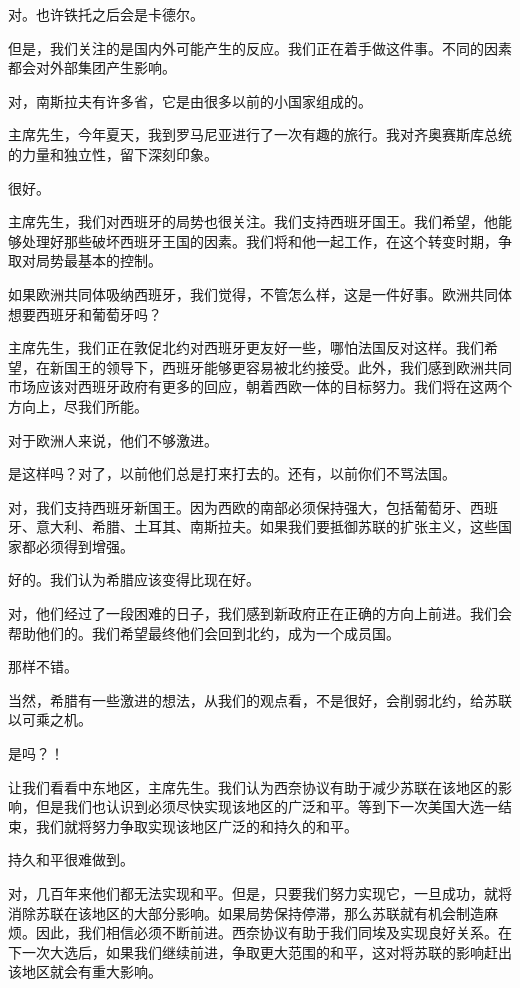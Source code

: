 对。也许铁托之后会是卡德尔。

但是，我们关注的是国内外可能产生的反应。我们正在着手做这件事。不同的因素都会对外部集团产生影响。

对，南斯拉夫有许多省，它是由很多以前的小国家组成的。

主席先生，今年夏天，我到罗马尼亚进行了一次有趣的旅行。我对齐奥赛斯库总统的力量和独立性，留下深刻印象。

很好。

主席先生，我们对西班牙的局势也很关注。我们支持西班牙国王。我们希望，他能够处理好那些破坏西班牙王国的因素。我们将和他一起工作，在这个转变时期，争取对局势最基本的控制。

如果欧洲共同体吸纳西班牙，我们觉得，不管怎么样，这是一件好事。欧洲共同体想要西班牙和葡萄牙吗？

主席先生，我们正在敦促北约对西班牙更友好一些，哪怕法国反对这样。我们希望，在新国王的领导下，西班牙能够更容易被北约接受。此外，我们感到欧洲共同市场应该对西班牙政府有更多的回应，朝着西欧一体的目标努力。我们将在这两个方向上，尽我们所能。

对于欧洲人来说，他们不够激进。

是这样吗？对了，以前他们总是打来打去的。还有，以前你们不骂法国。

对，我们支持西班牙新国王。因为西欧的南部必须保持强大，包括葡萄牙、西班牙、意大利、希腊、土耳其、南斯拉夫。如果我们要抵御苏联的扩张主义，这些国家都必须得到增强。

好的。我们认为希腊应该变得比现在好。

对，他们经过了一段困难的日子，我们感到新政府正在正确的方向上前进。我们会帮助他们的。我们希望最终他们会回到北约，成为一个成员国。

那样不错。

当然，希腊有一些激进的想法，从我们的观点看，不是很好，会削弱北约，给苏联以可乘之机。

是吗？！

让我们看看中东地区，主席先生。我们认为西奈协议有助于减少苏联在该地区的影响，但是我们也认识到必须尽快实现该地区的广泛和平。等到下一次美国大选一结束，我们就将努力争取实现该地区广泛的和持久的和平。

持久和平很难做到。

对，几百年来他们都无法实现和平。但是，只要我们努力实现它，一旦成功，就将消除苏联在该地区的大部分影响。如果局势保持停滞，那么苏联就有机会制造麻烦。因此，我们相信必须不断前进。西奈协议有助于我们同埃及实现良好关系。在下一次大选后，如果我们继续前进，争取更大范围的和平，这对将苏联的影响赶出该地区就会有重大影响。

